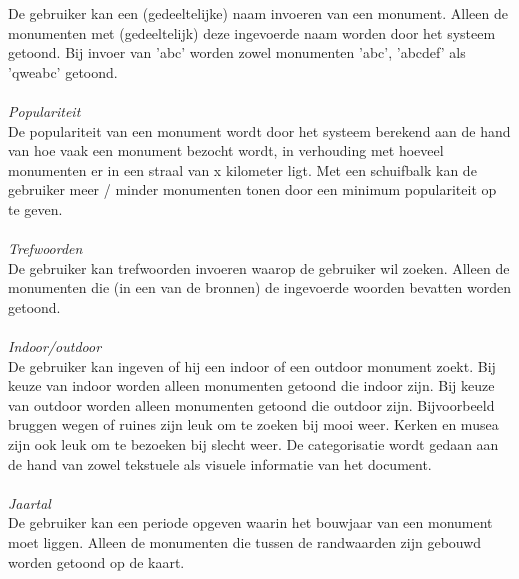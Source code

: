 \documentclass[a4paper,10pt]{article}
\begin{document}
			De gebruiker kan een (gedeeltelijke) naam invoeren van een monument. Alleen de monumenten met (gedeeltelijk) deze ingevoerde naam worden door het systeem getoond. Bij invoer van 'abc' worden zowel monumenten 'abc', 'abcdef' als 'qweabc' getoond.\\
			\\
			\textit{Populariteit}\\
			De populariteit van een monument wordt door het systeem berekend aan de hand van hoe vaak een monument bezocht wordt, in verhouding met hoeveel monumenten er in een straal van x kilometer ligt. Met een schuifbalk kan de gebruiker meer / minder monumenten tonen door een minimum populariteit op te geven.\\
			\\
			\textit{Trefwoorden}\\
			De gebruiker kan trefwoorden invoeren waarop de gebruiker wil zoeken. Alleen de monumenten die (in een van de bronnen) de ingevoerde woorden bevatten worden getoond.\\
			\\
			\textit{Indoor/outdoor}\\
			De gebruiker kan ingeven of hij een indoor of een outdoor monument zoekt. Bij keuze van indoor worden alleen monumenten getoond die indoor zijn. Bij keuze van outdoor worden alleen monumenten getoond die outdoor zijn. Bijvoorbeeld bruggen wegen of ruines zijn leuk om te zoeken bij mooi weer. Kerken en musea zijn ook leuk om te bezoeken bij slecht weer. De categorisatie wordt gedaan aan de hand van zowel tekstuele als visuele informatie van het document.\\
			\\
			\textit{Jaartal}\\
			De gebruiker kan een periode opgeven waarin het bouwjaar van een monument moet liggen. Alleen de monumenten die tussen de randwaarden zijn gebouwd worden getoond op de kaart.
\end{document}
